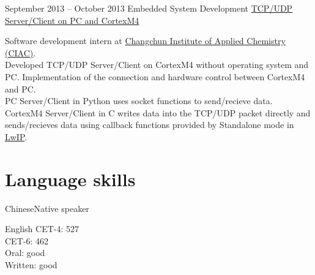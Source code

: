 \documentclass{tccv}
\begin{document}
\begin{eventlist}
  
\item{September 2013 -- October 2013}
  {Embedded System Development}
  {\href{https://github.com/YoungLeeNENU/Cortex-M4-LED-Control}{TCP/UDP Server/Client on PC and CortexM4}}

  Software development intern at \href{http://www.ciac.jl.cn/}{Changchun Institute of Applied Chemistry (CIAC)}.\\
  Developed TCP/UDP Server/Client on CortexM4 without operating system and PC. 
  Implementation of the connection and hardware control between CortexM4 and PC.\\
  PC Server/Client in Python uses socket functions to send/recieve data.\\
  CortexM4 Server/Client in C writes data into the TCP/UDP packet directly
  and sends/recieves data using callback functions provided by Standalone mode in 
  \href{http://savannah.nongnu.org/projects/lwip/}{LwIP}.
  
  
\end{eventlist}




\section{Language skills}    %

\begin{factlist}
\item{Chinese}{Native speaker}
\item{English}{
    CET-4: 527\\
    CET-6: 462\\
    Oral: good\\
    Written: good
  }

\end{factlist}
\end{document}
